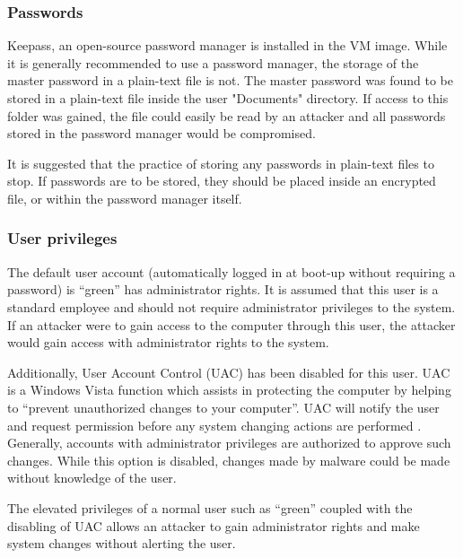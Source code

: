 \subsubsection{Passwords}

Keepass, an open-source password manager is installed in the VM image. While it is generally recommended to use a password manager, the storage of the master password in a plain-text file is not. The master password was found to be stored in a plain-text file inside the user "Documents" directory. If access to this folder was gained, the file could easily be read by an attacker and all passwords stored in the password manager would be compromised.

It is suggested that the practice of storing any passwords in plain-text files to stop. If passwords are to be stored, they should be placed inside an encrypted file, or within the password manager itself.

\subsubsection{User privileges}

The default user account (automatically logged in at boot-up without requiring a password) is ``green'' has administrator rights. It is assumed that this user is a standard employee and should not require administrator privileges to the system. If an attacker were to gain access to the computer through this user, the attacker would gain access with administrator rights to the system.

Additionally, User Account Control (UAC) has been disabled for this user. UAC is a Windows Vista function which assists in protecting the computer by helping to ``prevent unauthorized changes to your computer''. UAC will notify the user and request permission before any system changing actions are performed \citep{MicrosoftUAC}. Generally, accounts with administrator privileges are authorized to approve such changes. While this option is disabled, changes made by malware could be made without knowledge of the user.

The elevated privileges of a normal user such as ``green'' coupled with the disabling of UAC allows an attacker to gain administrator rights and make system changes without alerting the user.